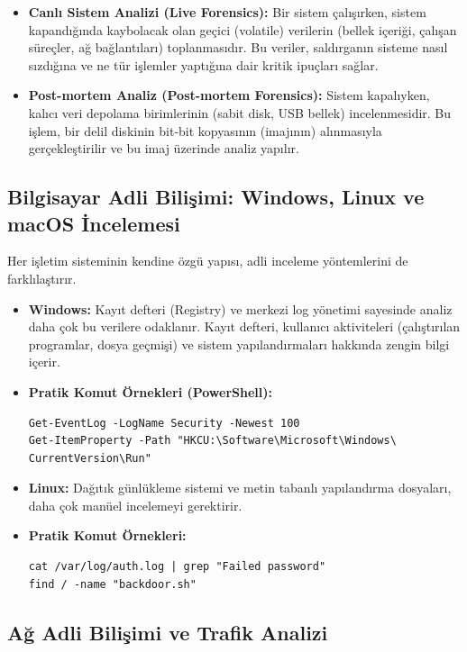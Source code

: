 \begin{itemize}
\begin{itemize}
\begin{itemize}
    \item \textbf{Canlı Sistem Analizi (Live Forensics):} Bir sistem çalışırken, sistem kapandığında kaybolacak olan geçici (volatile) verilerin (bellek içeriği, çalışan süreçler, ağ bağlantıları) toplanmasıdır. Bu veriler, saldırganın sisteme nasıl sızdığına ve ne tür işlemler yaptığına dair kritik ipuçları sağlar.
    \item \textbf{Post-mortem Analiz (Post-mortem Forensics):} Sistem kapalıyken, kalıcı veri depolama birimlerinin (sabit disk, USB bellek) incelenmesidir. Bu işlem, bir delil diskinin bit-bit kopyasının (imajının) alınmasıyla gerçekleştirilir ve bu imaj üzerinde analiz yapılır.
\end{itemize}

\subsection{Bilgisayar Adli Bilişimi: Windows, Linux ve macOS İncelemesi}

Her işletim sisteminin kendine özgü yapısı, adli inceleme yöntemlerini de farklılaştırır.

\begin{itemize}
    \item \textbf{Windows:} Kayıt defteri (Registry) ve merkezi log yönetimi sayesinde analiz daha çok bu verilere odaklanır. Kayıt defteri, kullanıcı aktiviteleri (çalıştırılan programlar, dosya geçmişi) ve sistem yapılandırmaları hakkında zengin bilgi içerir.
    \item \textbf{Pratik Komut Örnekleri (PowerShell):}
    \begin{verbatim}
Get-EventLog -LogName Security -Newest 100
Get-ItemProperty -Path "HKCU:\Software\Microsoft\Windows\
CurrentVersion\Run"
    \end{verbatim}
    \item \textbf{Linux:} Dağıtık günlükleme sistemi ve metin tabanlı yapılandırma dosyaları, daha çok manüel incelemeyi gerektirir.
    \item \textbf{Pratik Komut Örnekleri:}
    \begin{verbatim}
cat /var/log/auth.log | grep "Failed password"
find / -name "backdoor.sh"
    \end{verbatim}
\end{itemize}

\subsection{Ağ Adli Bilişimi ve Trafik Analizi}


\end{itemize}
\end{itemize}
